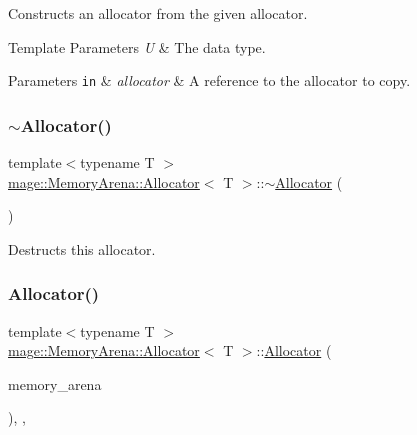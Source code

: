 Constructs an allocator from the given allocator.


\begin{DoxyTemplParams}{Template Parameters}
{\em U} & The data type. \\
\hline
\end{DoxyTemplParams}

\begin{DoxyParams}[1]{Parameters}
\mbox{\tt in}  & {\em allocator} & A reference to the allocator to copy. \\
\hline
\end{DoxyParams}
\mbox{\label{classmage_1_1_memory_arena_1_1_allocator_afbac57b961cea93932dff48c0a104c50}} 
\subsubsection{\texorpdfstring{$\sim$\+Allocator()}{~Allocator()}}
{\footnotesize\ttfamily template$<$typename T $>$ \\
\mbox{\hyperlink{classmage_1_1_memory_arena_1_1_allocator}{mage\+::\+Memory\+Arena\+::\+Allocator}}$<$ T $>$\+::$\sim$\mbox{\hyperlink{classmage_1_1_memory_arena_1_1_allocator}{Allocator}} (\begin{DoxyParamCaption}{ }\end{DoxyParamCaption})\hspace{0.3cm}{\ttfamily [default]}}

Destructs this allocator. \mbox{\label{classmage_1_1_memory_arena_1_1_allocator_a2b2b5fbc4b5552c88ee35e3c093a9468}} 
\subsubsection{\texorpdfstring{Allocator()}{Allocator()}\hspace{0.1cm}{\footnotesize\ttfamily [4/4]}}
{\footnotesize\ttfamily template$<$typename T $>$ \\
\mbox{\hyperlink{classmage_1_1_memory_arena_1_1_allocator}{mage\+::\+Memory\+Arena\+::\+Allocator}}$<$ T $>$\+::\mbox{\hyperlink{classmage_1_1_memory_arena_1_1_allocator}{Allocator}} (\begin{DoxyParamCaption}\item[{\mbox{\hyperlink{namespacemage_a8769f9d670d6b585ea306cb1062af94b}{Not\+Null}}$<$ \mbox{\hyperlink{classmage_1_1_memory_arena}{Memory\+Arena}} $\ast$ $>$}]{memory\+\_\+arena }\end{DoxyParamCaption})\hspace{0.3cm}{\ttfamily [explicit]}, {\ttfamily [private]}, {\ttfamily [noexcept]}}

